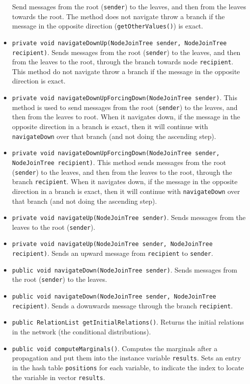 \begin{itemize}
  Send messages from the root (\texttt{sender}) to the leaves, and
  then from the leaves towards the root. The method does not navigate
  throw a branch if the message in the opposite direction
  (\texttt{getOtherValues()}) is exact.
\item \texttt{private void navigateDownUp(NodeJoinTree sender,
    NodeJoinTree recipient)}. Sends messages from the root
  (\texttt{sender}) to the leaves, and then from the leaves
  to the root, through the branch towards node \texttt{recipient}.
  This method do not navigate throw a branch if the message in the opposite
  direction is exact.
\item \texttt{private void navigateDownUpForcingDown(NodeJoinTree
    sender)}. This method is used to send messages from the root
  (\texttt{sender}) to the leaves, and then from the leaves
  to root. When it navigates  down,  if the message in the opposite direction
  in a branch is exact, then it will continue with \texttt{navigateDown}
  over that branch (and not doing the ascending step).
\item \texttt{private void navigateDownUpForcingDown(NodeJoinTree sender,
    NodeJoinTree recipient)}. This method sends messages from the root
  (\texttt{sender}) to the leaves, and then from the leaves
  to the root, through the branch \texttt{recipient}.
  When it navigates  down,  if the message in the opposite direction
  in a branch is exact, then it will
  continue with \texttt{navigateDown} over that branch
  (and not doing the ascending step).
\item \texttt{private void navigateUp(NodeJoinTree sender)}. Sends
  messages from the leaves to the root (\texttt{sender}).
\item \texttt{private void navigateUp(NodeJoinTree sender, NodeJoinTree
    recipient)}. Sends an upward message from \texttt{recipient} to
  \texttt{sender}.
\item \texttt{public void navigateDown(NodeJoinTree sender)}. Sends
  messages from the root (\texttt{sender}) to the leaves.
\item \texttt{public void navigateDown(NodeJoinTree sender, NodeJoinTree
    recipient)}. Sends a downwards message through the branch
  \texttt{recipient}.
\item \texttt{public RelationList getInitialRelations()}. Returns
  the initial relations in the network (the conditional distributions).
\item \texttt{public void computeMarginals()}. Computes the marginals
  after a propagation and put them into the instance variable
  \texttt{results}. Sets an entry in the hash table \texttt{positions}
  for each variable, to indicate the index to locate the variable
  in vector \texttt{results}.
  

\end{itemize}
